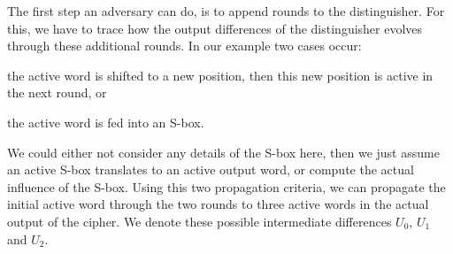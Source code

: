 \begin{figure}[t]
\begin{sidecaption}
    \end{sidecaption}
\end{figure}


The first step an adversary can do, is to append rounds to the distinguisher.
For this, we have to trace how the output differences of the distinguisher evolves through these additional rounds.
In our example two cases occur: \begin{inparaenum}
\item the active word is shifted to a new position, then this new position is active in the next round, or
\item the active word is fed into an S-box.
\end{inparaenum}
We could either not consider any details of the S-box here, then we just assume an active S-box translates to an active output word, or compute the actual influence of the S-box.
Using this two propagation criteria, we can propagate the initial active word through the two rounds to three active words in the actual output of the cipher.
We denote these possible intermediate differences $U_0$, $U_1$ and $U_2$.

